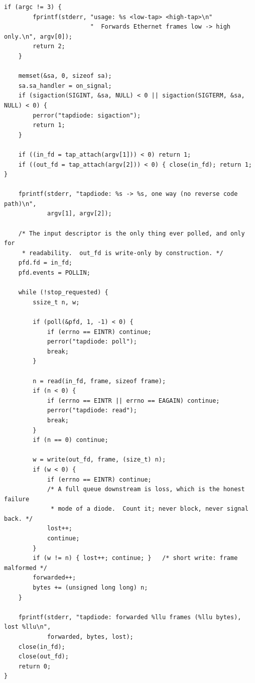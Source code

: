 \documentclass[11pt,a4paper]{article}
\begin{document}
\begin{lstlisting}[style=c,label={lst:tapdiode},caption={%
  \file{tapdiode.c} --- a one-way layer-2 forwarder. Build with
  \cmd{cc -O2 -Wall -Wextra -pedantic -std=c11 -o tapdiode tapdiode.c}}]
    if (argc != 3) {
        fprintf(stderr, "usage: %s <low-tap> <high-tap>\n"
                        "  Forwards Ethernet frames low -> high only.\n", argv[0]);
        return 2;
    }

    memset(&sa, 0, sizeof sa);
    sa.sa_handler = on_signal;
    if (sigaction(SIGINT, &sa, NULL) < 0 || sigaction(SIGTERM, &sa, NULL) < 0) {
        perror("tapdiode: sigaction");
        return 1;
    }

    if ((in_fd = tap_attach(argv[1])) < 0) return 1;
    if ((out_fd = tap_attach(argv[2])) < 0) { close(in_fd); return 1; }

    fprintf(stderr, "tapdiode: %s -> %s, one way (no reverse code path)\n",
            argv[1], argv[2]);

    /* The input descriptor is the only thing ever polled, and only for
     * readability.  out_fd is write-only by construction. */
    pfd.fd = in_fd;
    pfd.events = POLLIN;

    while (!stop_requested) {
        ssize_t n, w;

        if (poll(&pfd, 1, -1) < 0) {
            if (errno == EINTR) continue;
            perror("tapdiode: poll");
            break;
        }

        n = read(in_fd, frame, sizeof frame);
        if (n < 0) {
            if (errno == EINTR || errno == EAGAIN) continue;
            perror("tapdiode: read");
            break;
        }
        if (n == 0) continue;

        w = write(out_fd, frame, (size_t) n);
        if (w < 0) {
            if (errno == EINTR) continue;
            /* A full queue downstream is loss, which is the honest failure
             * mode of a diode.  Count it; never block, never signal back. */
            lost++;
            continue;
        }
        if (w != n) { lost++; continue; }   /* short write: frame malformed */
        forwarded++;
        bytes += (unsigned long long) n;
    }

    fprintf(stderr, "tapdiode: forwarded %llu frames (%llu bytes), lost %llu\n",
            forwarded, bytes, lost);
    close(in_fd);
    close(out_fd);
    return 0;
}
\end{lstlisting}
\end{document}
